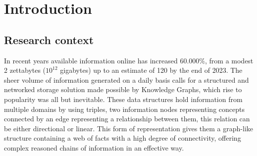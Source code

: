 \chapter{Introduction}\label{chap:introduction}



\section{Research context}\label{sec:intro-context}

In recent years available information online has increased 60.000\%, from a modest 2 zettabytes ($10^{12}$ gigabytes) up to an estimate of 120 by the end of 2023\cite{}. The sheer volume of information generated on a daily basis calls for a structured and networked storage solution made possible by Knowledge Graphs, which rise to popularity was all but inevitable. These data structures hold information from multiple domains by using triples, two information nodes representing concepts connected by an edge representing a relationship between them, this relation can be either directional or linear. This form of representation gives them a graph-like structure containing a web of facts with a high degree of connectivity, offering complex reasoned chains of information in an effective way.

